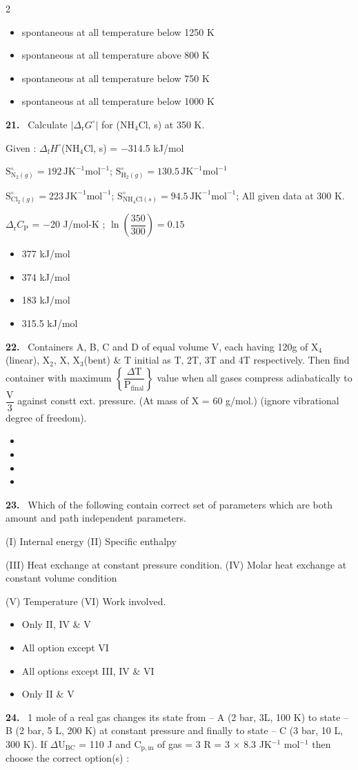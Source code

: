 \documentclass[10pt]{extarticle}
\newcommand{\qn}[1]{\par\smallskip\noindent\textbf{#1.}~}
\newenvironment{qoptions}{\begin{itemize}[leftmargin=1.8em,itemsep=1pt,topsep=2pt,label={}]}{\end{itemize}}
\newcommand{\opt}[2]{\item[(#1)] #2}
\begin{document}
\begin{multicols}{2}
\begin{qoptions}
\opt{A}{spontaneous at all temperature below 1250 K}
\opt{B}{spontaneous at all temperature above 800 K}
\opt{C}{spontaneous at all temperature below 750 K}
\opt{D}{spontaneous at all temperature below 1000 K}
\end{qoptions}
\qn{21} Calculate $|\Delta_\mathrm rG^\circ|$ for (NH$_4$Cl, s) at 350 K.\par
Given : $\Delta_\mathrm fH^\circ$(NH$_4$Cl, s) = $-$314.5 kJ/mol\par
$\mathrm S^\circ_{\mathrm N_2(g)}=192\,\mathrm{JK}^{-1}\mathrm{mol}^{-1}$; \quad $\mathrm S^\circ_{\mathrm H_2(g)}=130.5\,\mathrm{JK}^{-1}\mathrm{mol}^{-1}$\par
$\mathrm S^\circ_{\mathrm{Cl}_2(g)}=223\,\mathrm{JK}^{-1}\mathrm{mol}^{-1}$; \quad $\mathrm S^\circ_{\mathrm{NH}_4\mathrm{Cl}(s)}=94.5\,\mathrm{JK}^{-1}\mathrm{mol}^{-1}$; All given data at 300 K.\par
$\Delta_\mathrm rC_\mathrm P$ = $-$20 J/mol-K ; \quad $\ln\left(\dfrac{350}{300}\right)=0.15$
\begin{qoptions}
\opt{A}{377 kJ/mol}
\opt{B}{374 kJ/mol}
\opt{C}{183 kJ/mol}
\opt{D}{315.5 kJ/mol}
\end{qoptions}
\qn{22} Containers A, B, C and D of equal volume V, each having 120g of X$_4$(linear), X$_2$, X, X$_3$(bent) \& T initial as T, 2T, 3T and 4T respectively. Then find container with maximum $\left\{\dfrac{\Delta\mathrm T}{\mathrm P_\mathrm{final}}\right\}$ value when all gases compress adiabatically to $\dfrac{\mathrm V}3$ against constt ext. pressure. (At mass of X = 60 g/mol.) (ignore vibrational degree of freedom).
\begin{qoptions}
\opt{A}{}
\opt{B}{}
\opt{C}{}
\opt{D}{}
\end{qoptions}
\qn{23} Which of the following contain correct set of parameters which are both amount and path independent parameters.\par
(I) Internal energy \quad (II) Specific enthalpy\par
(III) Heat exchange at constant pressure condition. \quad (IV) Molar heat exchange at constant volume condition\par
(V) Temperature \quad (VI) Work involved.
\begin{qoptions}
\opt{A}{Only II, IV \& V}
\opt{B}{All option except VI}
\opt{C}{All options except III, IV \& VI}
\opt{D}{Only II \& V}
\end{qoptions}
\qn{24} 1 mole of a real gas changes its state from -- A (2 bar, 3L, 100 K) to state -- B (2 bar, 5 L, 200 K) at constant pressure and finally to state -- C (3 bar, 10 L, 300 K). If $\Delta$U$_\mathrm{BC}$ = 110 J and C$_\mathrm{p,m}$ of gas = 3 R = 3 $\times$ 8.3 JK$^{-1}$ mol$^{-1}$ then choose the correct option(s) :

\end{multicols}
\end{document}
